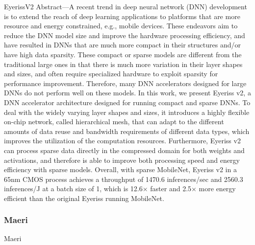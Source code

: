 EyerissV2
Abstract—A recent trend in deep neural network (DNN)
development is to extend the reach of deep learning applications
to platforms that are more resource and energy constrained, e.g.,
mobile devices. These endeavors aim to reduce the DNN model
size and improve the hardware processing efficiency, and have
resulted in DNNs that are much more compact in their structures
and/or have high data sparsity. These compact or sparse models
are different from the traditional large ones in that there is
much more variation in their layer shapes and sizes, and often
require specialized hardware to exploit sparsity for performance
improvement. Therefore, many DNN accelerators designed for
large DNNs do not perform well on these models. In this work,
we present Eyeriss v2, a DNN accelerator architecture designed
for running compact and sparse DNNs. To deal with the widely
varying layer shapes and sizes, it introduces a highly flexible
on-chip network, called hierarchical mesh, that can adapt to the
different amounts of data reuse and bandwidth requirements
of different data types, which improves the utilization of the
computation resources. Furthermore, Eyeriss v2 can process
sparse data directly in the compressed domain for both weights
and activations, and therefore is able to improve both processing
speed and energy efficiency with sparse models. Overall, with
sparse MobileNet, Eyeriss v2 in a 65nm CMOS process achieves
a throughput of 1470.6 inferences/sec and 2560.3 inferences/J at
a batch size of 1, which is 12.6× faster and 2.5× more energy
efficient than the original Eyeriss running MobileNet.

\subsubsection{Maeri}

Maeri 
 
